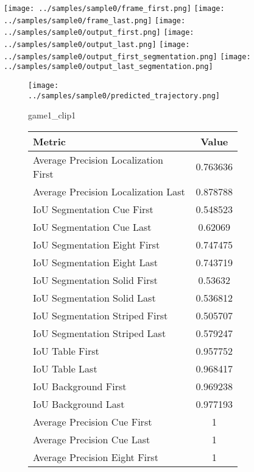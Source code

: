 \begin{figure}
\texttt{[image: ../samples/sample0/frame\_first.png]}
\texttt{[image: ../samples/sample0/frame\_last.png]}
\newline
\texttt{[image: ../samples/sample0/output\_first.png]}
\texttt{[image: ../samples/sample0/output\_last.png]}
\newline
\texttt{[image: ../samples/sample0/output\_first\_segmentation.png]}
\texttt{[image: ../samples/sample0/output\_last\_segmentation.png]}
\newline
\begin{subfigure}[b]{0.49\textwidth}
    \vspace{20pt}
    \texttt{[image: ../samples/sample0/predicted\_trajectory.png]}
    \caption*{game1\_clip1}
\end{subfigure}
\begin{subfigure}[b]{0.49\textwidth}
\begin{tabular}{|l|c|}
    \hline
    \textbf{Metric} & \textbf{Value} \\
    \hline
    Average Precision Localization First & 0.763636 \\
    Average Precision Localization Last & 0.878788 \\
    \hline
    IoU Segmentation Cue First & 0.548523 \\
    IoU Segmentation Cue Last & 0.62069 \\
    IoU Segmentation Eight First & 0.747475 \\
    IoU Segmentation Eight Last & 0.743719 \\
    IoU Segmentation Solid First & 0.53632 \\
    IoU Segmentation Solid Last & 0.536812 \\
    IoU Segmentation Striped First & 0.505707 \\
    IoU Segmentation Striped Last & 0.579247 \\
    \hline
    IoU Table First & 0.957752 \\
    IoU Table Last & 0.968417 \\
    IoU Background First & 0.969238 \\
    IoU Background Last & 0.977193 \\
    \hline
    Average Precision Cue First & 1 \\
    Average Precision Cue Last & 1 \\
    Average Precision Eight First & 1 \\

\end{tabular}
\end{subfigure}
\end{figure}
